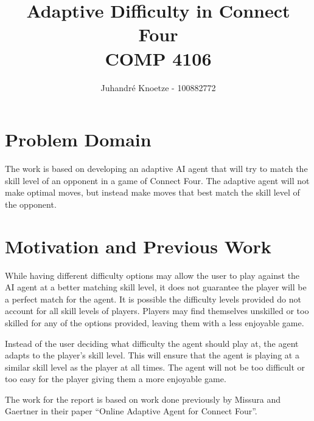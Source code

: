 \documentclass[12pt]{article}
\title{
    \vfill
    Adaptive Difficulty in Connect Four \\
    COMP 4106
}
\author{
    Juhandr\'{e} Knoetze - 100882772
}
\begin{document}
\begin{titlepage}
    \maketitle
    \vfill
    \thispagestyle{empty}
\end{titlepage}






\section*{Problem Domain}
The work is based on developing an adaptive AI agent that will try to match the skill level of an opponent in a game of Connect Four. The adaptive agent will not make optimal moves, but instead make moves that best match the skill level of the opponent.


\section*{Motivation and Previous Work}
While having different difficulty options may allow the user to play against the AI agent at a better matching skill level, it does not guarantee the player will be a perfect match for the agent. It is possible the difficulty levels provided do not account for all skill levels of players. Players may find themselves unskilled or too skilled for any of the options provided, leaving them with a less enjoyable game.

Instead of the user deciding what difficulty the agent should play at, the agent adapts to the player's skill level. This will ensure that the agent is playing at a similar skill level as the player at all times. The agent will not be too difficult or too easy for the player giving them a more enjoyable game.

The work for the report is based on work done previously by Missura and Gaertner in their paper ``Online Adaptive Agent for Connect Four''.
\end{document}
